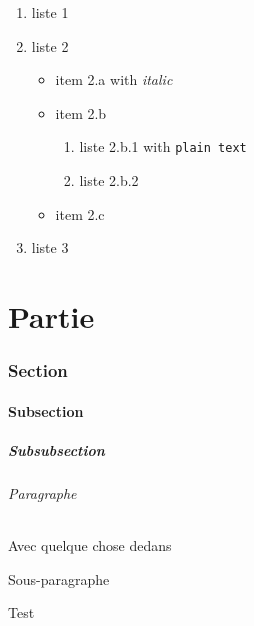 \documentclass{article}
\begin{document}
			

			\begin{enumerate}
				\item liste 1
				\item liste 2
					\begin{itemize}[label=$\bullet$]
						\item item 2.a with \textit{italic}
						\item item 2.b
							\begin{enumerate}
								\item liste 2.b.1 with \verb?plain text?
								\item liste 2.b.2
							\end{enumerate}
						\item item 2.c
					\end{itemize}
				\item liste 3
			\end{enumerate}

			

	\part{Partie}

		\section{Section}

			\subsection{Subsection}

				\subsubsection{Subsubsection}

					\paragraph{Paragraphe}%
						Avec quelque chose dedans

						\subparagraph{Sous-paragraphe}%
							Test
\end{document}

